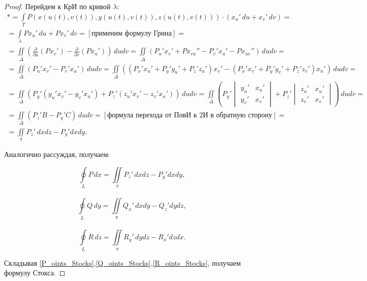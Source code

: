 \documentclass[../../main.tex]{subfiles}
\begin{document}
\begin{proof}
			 Перейдем к КрИ по кривой $\lambda$:
			 \begin{gather*}
			 * = \int \limits_T P ( x( u( t), v( t)   ), y( u( t), v( t)   )  ,z( u( t), v( t)   ) )\cdot( x_u' \, du + x_v ' \, dv ) =  \\
			 = \int \limits_{\lambda} P x_u' \, du +  P x_v' \, dv =  \left[   \text{применим формулу Грина}  \right] = \\
			 = \iint \limits_{\Delta} \left( \frac{\partial}{\partial{u}} (P x_v') - \frac{\partial}{\partial{v}} (P x_u') \right) \, du dv = \iint \limits_{\Delta} \left(
			 P_u' x_v ' + P x_{vu} '' - P_v' x_u' - P x_{uv}'' \right) \, du dv  =  \\
			 = \iint \limits_{\Delta} \left(
			 P_u' x_v ' - P_v' x_u' \right) \, du dv  = \iint \limits_{\Delta} \left( \left( P_x' x_u' + P_y' y_u' + P_z ' z_u' \right) x_v' - \left( P_x' x_v' + P_y' y_v' + P_z ' z_v' \right) x_u'  \right) \, du dv =  \\
			 = \iint \limits_{\Delta} \left( P_y'\left( y_u' x_v' - y_v' x_u' \right) + P_z'\left( z_u' x_v' - z_v' x_u' \right)   \right) \, du dv = \iint \limits_{\Delta} \left( P_y' \begin{vmatrix} y_u' & x_u' \\ y_v' & x_v'  \end{vmatrix} + P_z' \begin{vmatrix} z_u' & x_u' \\ z_v' & x_v'  \end{vmatrix} \right) \, dudv =      \\
			 = \iint \limits_{\Delta}  \left( P_z' B - P_y' C  \right) \, dudv = [\text{формула перехода от ПовИ к 2И в обратную сторону}] = \\ = \iint \limits_{\pi}  P_z' \, dxdz - P_y' dxdy.     \end{gather*}
			
			Аналогично рассуждая, получаем:
			
			 \begin{equation} \label{P_oints_Stocks} \oint \limits_L P \, dx = \iint \limits_{\pi}  P_z' \, dxdz - P_y' dxdy, \end{equation}\\
			\begin{equation}  \label{Q_oints_Stocks} \oint \limits_L Q \, dy = \iint \limits_{\pi}  Q_x' \, dxdy - Q_z' dydz, \end{equation}\\
			\begin{equation}  \label{R_oints_Stocks} \oint \limits_L R \, dz = \iint \limits_{\pi}  R_y' \, dydz - R_x' dzdx. \end{equation}
			
			Складывая \eqref{P_oints_Stocks},\eqref{Q_oints_Stocks},\eqref{R_oints_Stocks}, получаем формулу Стокса.
		\end{proof}	
			
\end{document}
